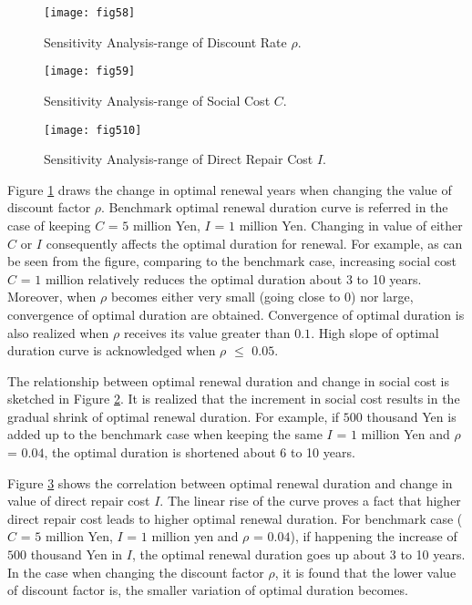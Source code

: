 \begin{figure}[t]
\begin{center}
\texttt{[image: fig58]} 
\end{center}
\caption{Sensitivity Analysis-range of Discount Rate $\rho$.}
\label{fig58} 
\end{figure}
%
\begin{figure}[t]
\begin{center}
\texttt{[image: fig59]} 
\end{center}
\caption{Sensitivity Analysis-range of Social Cost $C$.}
\label{fig59} 
\end{figure}
%
\begin{figure}[t]
\begin{center}
\texttt{[image: fig510]} 
\end{center}
\caption{Sensitivity Analysis-range of Direct Repair Cost $I$.}
\label{fig510} 
\end{figure}

Figure \ref{fig58} draws the change in optimal renewal years when changing the value of discount factor $\rho$. Benchmark optimal renewal duration curve is referred in the case of keeping $C$ = $5$ million Yen, $I$ = $1$ million Yen. Changing in value of either $C$ or $I$ consequently affects the optimal duration for renewal. For example, as can be seen from the figure, comparing to the benchmark case, increasing social cost $C$ = $1$ million relatively reduces the optimal duration about 3 to 10 years. Moreover, when $\rho$ becomes either very small (going close to $0$) nor large, convergence of optimal duration are obtained. Convergence of optimal duration is also realized when $\rho$ receives its value greater than $0.1$. High slope of optimal duration curve is acknowledged when $\rho$ $\le$ $0.05$.

The relationship between optimal renewal duration and change in social cost is sketched in Figure \ref{fig59}. It is realized that the increment in social cost results in the gradual shrink of optimal renewal duration. For example, if $500$ thousand Yen is added up to the benchmark case when keeping the same $I$ = $1$ million Yen and $\rho$ = $0.04$, the optimal duration is shortened about 6 to 10 years. 

Figure \ref{fig510} shows the correlation between optimal renewal duration and change in value of direct repair cost $I$. The linear rise of the curve proves a fact that higher direct repair cost leads to higher optimal renewal duration. For benchmark case ($C$ = $5$ million Yen, $I$ = $1$ million yen and $\rho$ = $0.04$), if happening the increase of $500$ thousand Yen in $I$, the optimal renewal duration goes up about 3 to 10 years. In the case when changing the discount factor $\rho$, it is found that the lower value of discount factor is, the smaller variation of optimal duration becomes.

